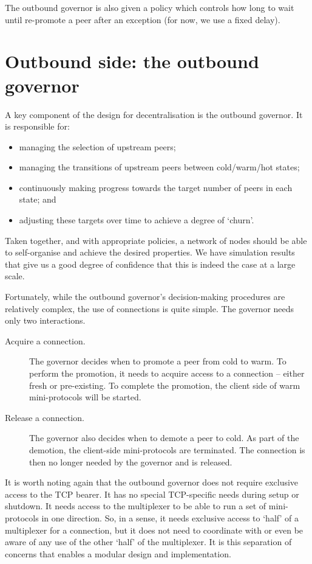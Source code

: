 The outbound governor is also given a policy which controls how long to wait
until re-promote a peer after an exception (for now, we use a fixed delay).

\section{Outbound side: the outbound governor}

A key component of the design for decentralisation is the outbound governor. It
is responsible for:
\begin{itemize}
\item managing the selection of upstream peers;
\item managing the transitions of upstream peers between cold/warm/hot states;
\item continuously making progress towards the target number of peers in each
      state; and
\item adjusting these targets over time to achieve a degree of `churn'.
\end{itemize}
Taken together, and with appropriate policies, a network of nodes should be
able to self-organise and achieve the desired properties. We have simulation
results that give us a good degree of confidence that this is indeed the case
at a large scale.

Fortunately, while the outbound governor's decision-making procedures are relatively
complex, the use of connections is quite simple. The governor needs only two
interactions.
\begin{description}
\item[Acquire a connection.] The governor decides when to promote a peer from
  cold to warm. To perform the promotion, it needs to acquire access to a
  connection -- either fresh or pre-existing. To complete the promotion, the client side of warm mini-protocols will be started.

\item[Release a connection.] The governor also decides when to demote a peer to
  cold. As part of the demotion, the client-side mini-protocols are terminated.
  The connection is then no longer needed by the governor and is released.
\end{description}

It is worth noting again that the outbound governor does not require exclusive
access to the TCP bearer. It has no special TCP-specific needs during setup or
shutdown.
It needs access to the multiplexer to be able to run a set of
mini-protocols in one direction. So, in a sense, it needs exclusive access to
`half' of a multiplexer for a connection, but it does not need to coordinate with or
even be aware of any use of the other `half' of the multiplexer. It is this
separation of concerns that enables a modular design and implementation.


